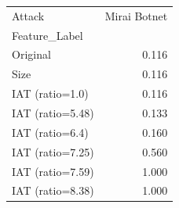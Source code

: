 \begin{tabular}{lr}
\toprule
Attack & Mirai Botnet \\
Feature_Label &  \\
\midrule
Original & 0.116 \\
Size & 0.116 \\
IAT (ratio=1.0) & 0.116 \\
IAT (ratio=5.48) & 0.133 \\
IAT (ratio=6.4) & 0.160 \\
IAT (ratio=7.25) & 0.560 \\
IAT (ratio=7.59) & 1.000 \\
IAT (ratio=8.38) & 1.000 \\
\bottomrule
\end{tabular}

